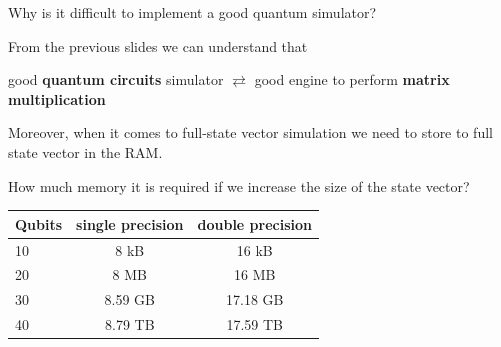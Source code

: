 \documentclass[11p,aspectratio=169]{beamer}
\begin{document}
\begin{frame}{Why is it difficult to implement a good quantum simulator?}

    From the previous slides we can understand that 
    \begin{center}
    
        good \textbf{quantum circuits} simulator $\rightleftarrows$ good engine to perform \textbf{matrix multiplication}
    \end{center}
    
    Moreover, when it comes to full-state vector simulation we need to store to
    full state vector in the RAM.

    How much memory it is required if we increase the size of the state vector?

    \begin{table}
        \centering
        \begin{tabular}{lcc}
            \toprule
            \textbf{Qubits} & single precision & double precision \\
            \midrule
            10 & 8 kB & 16 kB \\
            20 & 8 MB & 16 MB \\
            30 & 8.59 GB & 17.18 GB \\
            40 & 8.79 TB & 17.59 TB \\
            \bottomrule
        \end{tabular}
        \label{tab:qibo_versions}
        \end{table}


    



    
\end{frame}
\end{document}

